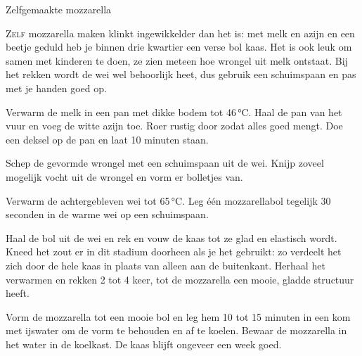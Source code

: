 \begin{recipe}{Zelfgemaakte mozzarella}
\label{recipe:mozzarella}


\lettrine{Z}{elf} mozzarella maken klinkt ingewikkelder dan het is: met melk en
azijn en een beetje geduld heb je binnen drie kwartier een verse bol kaas. Het
is ook leuk om samen met kinderen te doen, ze zien meteen hoe wrongel uit melk
ontstaat. Bij het rekken wordt de wei wel behoorlijk heet, dus gebruik een
schuimspaan en pas met je handen goed op.

\begin{ingredients}
\end{ingredients}

\begin{steps}
  \item Verwarm de melk in een pan met dikke bodem tot 46\,°C. Haal de pan van het vuur en voeg de
        witte azijn toe. Roer rustig door zodat alles goed mengt. Doe een
        deksel op de pan en laat 10 minuten staan.
  \item Schep de gevormde wrongel met een schuimspaan uit de wei. Knijp
        zoveel mogelijk vocht uit de wrongel en vorm er bolletjes van.
  \item Verwarm de achtergebleven wei tot 65\,°C. Leg één mozzarellabol
        tegelijk 30 seconden in de warme wei op een schuimspaan.
  \item Haal de bol uit de wei en rek en vouw de kaas tot ze glad en
        elastisch wordt. Kneed het zout er in dit stadium doorheen als je
        het gebruikt: zo verdeelt het zich door de hele kaas in plaats van
        alleen aan de buitenkant. Herhaal het verwarmen en rekken 2 tot 4
        keer, tot de mozzarella een mooie, gladde structuur heeft.
  \item Vorm de mozzarella tot een mooie bol en leg hem 10 tot 15 minuten in
        een kom met ijswater om de vorm te behouden en af te koelen. Bewaar
        de mozzarella in het water in de koelkast. De kaas blijft ongeveer
        een week goed.
\end{steps}
\end{recipe}
